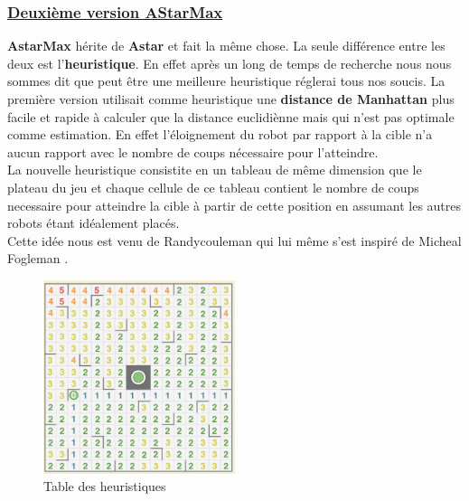 \documentclass[12pt]{article}
\begin{document}
	\subsubsection{\underline{Deuxième version AStarMax}} 
	\textbf{AstarMax} hérite de \textbf{Astar} et fait la même chose. La seule différence entre les deux est l'\textbf{heuristique}.
	En effet après un long de temps de recherche nous nous sommes dit que peut être une meilleure heuristique réglerai tous nos soucis. La première version
	utilisait comme heuristique une \textbf{distance de Manhattan} plus facile et rapide à calculer que la distance euclidiènne mais qui n'est pas 
	optimale comme estimation. En effet l'éloignement du robot par rapport à la cible n'a aucun rapport avec le nombre de coups nécessaire pour l'atteindre.\\
	La nouvelle heuristique consistite en un tableau de même dimension que le plateau du jeu et chaque cellule de ce tableau contient le nombre de 
	coups necessaire pour atteindre la cible à partir de cette position en assumant les autres robots étant idéalement placés.\\
	Cette idée nous est venu de Randycouleman \cite{heurist} qui lui même s'est inspiré de Micheal Fogleman \cite{MF}.
	\begin{figure}[h!]
		\centering
		\includegraphics[width=0.5\textwidth]{Images/mapHeuristique.PNG}
		\caption{Table des heuristiques}
	\end{figure}
\end{document}

